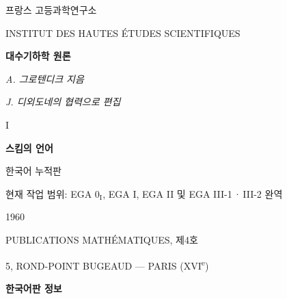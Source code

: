 \begin{titlepage}
\centering

{\Large 프랑스 고등과학연구소\par}
\vspace{0.4em}
{\large INSTITUT DES HAUTES ÉTUDES SCIENTIFIQUES\par}

\vfill

{\Large\bfseries 대수기하학 원론\par}
\vspace{1.5em}
{\large\itshape A. 그로텐디크 지음\par}
\vspace{0.7em}
{\itshape J. 디외도네의 협력으로 편집\par}

\vspace{2em}
I

\vspace{1.5em}
{\Large\bfseries 스킴의 언어\par}

\vspace{1.6em}
{\large 한국어 누적판\par}
\vspace{0.5em}
{\small 현재 작업 범위: EGA $0_{\mathrm I}$, EGA I, EGA II 및 EGA III-1\,·\,III-2 완역\par}

\vfill
{\Large 1960\par}
\vspace{1.2em}
{\Large PUBLICATIONS MATHÉMATIQUES, 제4호\par}
\vspace{0.5em}
{\large 5, ROND-POINT BUGEAUD --- PARIS (XVI\textsuperscript{e})\par}
\end{titlepage}

\thispagestyle{empty}
\begin{center}
{\Large\bfseries 한국어판 정보\par}
\end{center}

